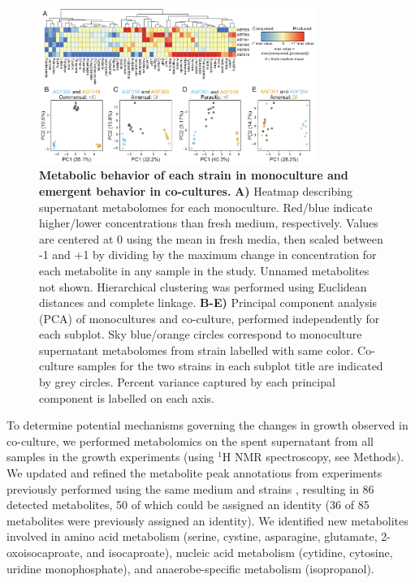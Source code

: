 \documentclass[11pt,onecolumn,notitlepage,openany,twoside]{book}
\begin{document}
\begin{refsection}
\begin{figure}[t]
\centering
\includegraphics[width=0.8\textwidth]{ch2_fig3}
\caption[Metabolic behavior of each strain in monoculture and emergent behavior in co-cultures.]{\textbf{Metabolic behavior of each strain in monoculture and emergent behavior in co-cultures.} \textbf{A)} Heatmap describing supernatant metabolomes for each monoculture. Red/blue indicate higher/lower concentrations than fresh medium, respectively. Values are centered at 0 using the mean in fresh media, then scaled between -1 and +1 by dividing by the maximum change in concentration for each metabolite in any sample in the study. Unnamed metabolites not shown. Hierarchical clustering was performed using Euclidean distances and complete linkage. \textbf{B-E)} Principal component analysis (PCA) of monocultures and co-culture, performed independently for each subplot. Sky blue/orange circles correspond to monoculture supernatant metabolomes from strain labelled with same color. Co-culture samples for the two strains in each subplot title are indicated by grey circles. Percent variance captured by each principal component is labelled on each axis.}
\end{figure}

To determine potential mechanisms governing the changes in growth observed in co-culture, we performed metabolomics on the spent supernatant from all samples in the growth experiments (using  $^1\!$H NMR spectroscopy, see Methods). We updated and refined the metabolite peak annotations from experiments previously performed using the same medium and strains \cite{Biggs2017-fs}, resulting in 86 detected metabolites, 50 of which could be assigned an identity (36 of 85 metabolites were previously assigned an identity). We identified new metabolites involved in amino acid metabolism (serine, cystine, asparagine, glutamate, 2-oxoisocaproate, and isocaproate), nucleic acid metabolism (cytidine, cytosine, uridine monophosphate), and anaerobe-specific metabolism (isopropanol).


\end{refsection}
\end{document}
